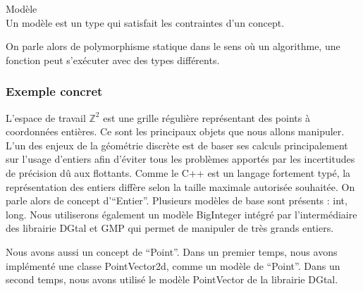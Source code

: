 \begin{Definition}{Modèle}\\
  Un modèle est un type qui satisfait les contraintes d'un concept.
\label{def:cpp-mod}

\end{Definition}

On parle alors de polymorphisme statique dans le sens où un algorithme, une fonction peut s'exécuter avec des types différents.

\subsubsection{Exemple concret}

L'espace de travail $\mathbb{Z}^{2}$ est une grille régulière représentant des points à coordonnées entières. Ce sont les principaux objets que nous allons manipuler. L'un des enjeux de la géométrie discrète est de baser ses calculs principalement sur l'usage d'entiers afin d'éviter tous les problèmes apportés par les incertitudes de précision dû aux flottants. Comme le C++ est un langage fortement typé, la représentation des entiers diffère selon la taille maximale autorisée souhaitée. On parle alors de concept d'``Entier''. Plusieurs modèles de base sont présents : int, long. Nous utiliserons également un modèle BigInteger intégré par l'intermédiaire des librairie DGtal et GMP qui permet de manipuler de très grands entiers.

Nous avons aussi un concept de ``Point''. Dans un premier temps, nous avons implémenté une classe PointVector2d, comme un modèle de ``Point''. Dans un second temps, nous avons utilisé le modèle PointVector de la librairie DGtal.  



